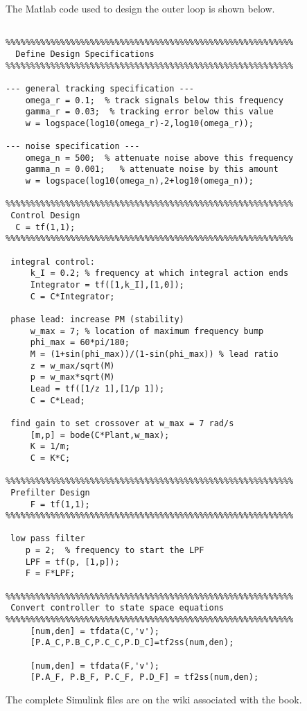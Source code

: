 The Matlab code used to design the outer loop is shown below.
\begin{lstlisting}

%%%%%%%%%%%%%%%%%%%%%%%%%%%%%%%%%%%%%%%%%%%%%%%%%%%%%%%%%%
  Define Design Specifications
%%%%%%%%%%%%%%%%%%%%%%%%%%%%%%%%%%%%%%%%%%%%%%%%%%%%%%%%%%

--- general tracking specification ---
    omega_r = 0.1;  % track signals below this frequency
    gamma_r = 0.03;  % tracking error below this value
    w = logspace(log10(omega_r)-2,log10(omega_r));

--- noise specification ---
    omega_n = 500;  % attenuate noise above this frequency
    gamma_n = 0.001;   % attenuate noise by this amount
    w = logspace(log10(omega_n),2+log10(omega_n));

%%%%%%%%%%%%%%%%%%%%%%%%%%%%%%%%%%%%%%%%%%%%%%%%%%%%%%%%%%
 Control Design
  C = tf(1,1);
%%%%%%%%%%%%%%%%%%%%%%%%%%%%%%%%%%%%%%%%%%%%%%%%%%%%%%%%%%

 integral control: 
     k_I = 0.2; % frequency at which integral action ends
     Integrator = tf([1,k_I],[1,0]);
     C = C*Integrator;

 phase lead: increase PM (stability)
     w_max = 7; % location of maximum frequency bump
     phi_max = 60*pi/180;
     M = (1+sin(phi_max))/(1-sin(phi_max)) % lead ratio
     z = w_max/sqrt(M)
     p = w_max*sqrt(M)
     Lead = tf([1/z 1],[1/p 1]);
     C = C*Lead;

 find gain to set crossover at w_max = 7 rad/s
     [m,p] = bode(C*Plant,w_max);
     K = 1/m;
     C = K*C;

%%%%%%%%%%%%%%%%%%%%%%%%%%%%%%%%%%%%%%%%%%%%%%%%%%%%%%%%%%
 Prefilter Design
     F = tf(1,1);
%%%%%%%%%%%%%%%%%%%%%%%%%%%%%%%%%%%%%%%%%%%%%%%%%%%%%%%%%%
   
 low pass filter
    p = 2;  % frequency to start the LPF
    LPF = tf(p, [1,p]);
    F = F*LPF;
        
%%%%%%%%%%%%%%%%%%%%%%%%%%%%%%%%%%%%%%%%%%%%%%%%%%%%%%%%%%
 Convert controller to state space equations 
%%%%%%%%%%%%%%%%%%%%%%%%%%%%%%%%%%%%%%%%%%%%%%%%%%%%%%%%%%
     [num,den] = tfdata(C,'v');
     [P.A_C,P.B_C,P.C_C,P.D_C]=tf2ss(num,den);

     [num,den] = tfdata(F,'v');
     [P.A_F, P.B_F, P.C_F, P.D_F] = tf2ss(num,den);
\end{lstlisting}

The complete Simulink files are on the wiki associated with the book.


